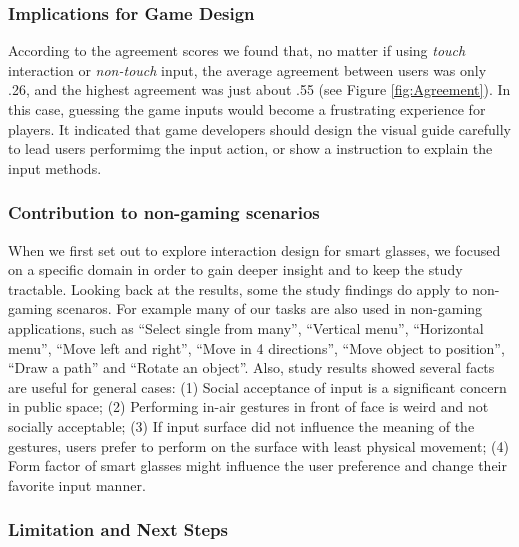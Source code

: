 \documentclass{sigchi}
\begin{document}
  \subsubsection{Implications for Game Design}
  According to the agreement scores we found that, no matter if using \emph{touch} interaction or \emph{non-touch} input, the average agreement between users was only .26, and the highest agreement was just about .55 (see Figure \ref{fig:Agreement}). In this case, guessing the game inputs would become a frustrating experience for players. It indicated that game developers should design the visual guide carefully to lead users performimg the input action, or show a instruction to explain the input methods.

  \subsubsection{Contribution to non-gaming scenarios}
  When we first set out to explore interaction design for smart glasses, we focused on a specific domain in order to gain deeper insight and to keep the study tractable. Looking back at the results, some the study findings do apply to non-gaming scenaros. For example many of our tasks are also used in non-gaming applications, such as ``Select single from many'', ``Vertical menu'', ``Horizontal menu'', ``Move left and right'', ``Move in 4 directions'', ``Move object to position'', ``Draw a path'' and ``Rotate an object''. Also, study results showed several facts are useful for general cases: (1) Social acceptance of input is a significant concern in public space; (2) Performing in-air gestures in front of face is weird and not socially acceptable; (3) If input surface did not influence the meaning of the gestures, users prefer to perform on the surface with least physical movement; (4) Form factor of smart glasses might influence the user preference and change their favorite input manner.
  \subsubsection{Limitation and Next Steps}

\end{document}
